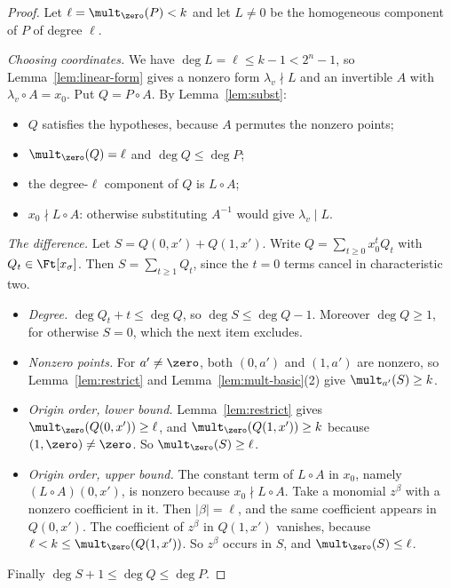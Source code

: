 \begin{proof}
Let \(\ell=\mult_{\zero}(P)<k\) and let \(L\ne0\) be the homogeneous component of
\(P\) of degree \(\ell\).

\emph{Choosing coordinates.} We have \(\deg L=\ell\le k-1<2^n-1\), so
Lemma~\ref{lem:linear-form} gives a nonzero form \(\lambda_v\nmid L\) and an
invertible \(A\) with \(\lambda_v\circ A=x_0\). Put \(Q=P\circ A\). By
Lemma~\ref{lem:subst}:
\begin{itemize}
 \item \(Q\) satisfies the hypotheses, because \(A\) permutes the nonzero points;
 \item \(\mult_{\zero}(Q)=\ell\) and \(\deg Q\le\deg P\);
 \item the degree-\(\ell\) component of \(Q\) is \(L\circ A\);
 \item \(x_0\nmid L\circ A\): otherwise substituting \(A^{-1}\) would give
 \(\lambda_v\mid L\).
\end{itemize}

\emph{The difference.} Let \(S=Q(0,x')+Q(1,x')\). Write \(Q=\sum_{t\ge0}x_0^tQ_t\)
with \(Q_t\in\Ft[x_\sigma]\). Then \(S=\sum_{t\ge1}Q_t\), since the \(t=0\) terms
cancel in characteristic two.
\begin{itemize}
 \item \emph{Degree.} \(\deg Q_t+t\le\deg Q\), so \(\deg S\le\deg Q-1\). Moreover
 \(\deg Q\ge1\), for otherwise \(S=0\), which the next item excludes.
 \item \emph{Nonzero points.} For \(a'\ne\zero\), both \((0,a')\) and \((1,a')\) are
 nonzero, so Lemma~\ref{lem:restrict} and Lemma~\ref{lem:mult-basic}(2) give
 \(\mult_{a'}(S)\ge k\).
 \item \emph{Origin order, lower bound.} Lemma~\ref{lem:restrict} gives
 \(\mult_{\zero}(Q(0,x'))\ge\ell\), and \(\mult_{\zero}(Q(1,x'))\ge k\) because
 \((1,\zero)\ne\zero\). So \(\mult_{\zero}(S)\ge\ell\).
 \item \emph{Origin order, upper bound.} The constant term of \(L\circ A\) in
 \(x_0\), namely \((L\circ A)(0,x')\), is nonzero because \(x_0\nmid L\circ A\).
 Take a monomial \(z^\beta\) with a nonzero coefficient in it. Then
 \(|\beta|=\ell\), and the same coefficient appears in \(Q(0,x')\). The
 coefficient of \(z^\beta\) in \(Q(1,x')\) vanishes, because
 \(\ell<k\le\mult_{\zero}(Q(1,x'))\). So \(z^\beta\) occurs in \(S\), and
 \(\mult_{\zero}(S)\le\ell\).
\end{itemize}
Finally \(\deg S+1\le\deg Q\le\deg P\).
\end{proof}


